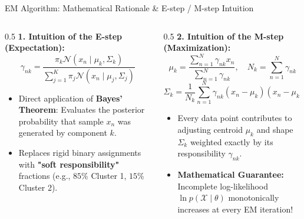 \documentclass[aspectratio=169,10pt]{beamer}
\begin{document}
\begin{frame}{EM Algorithm: Mathematical Rationale \& E-step / M-step Intuition}
  \small
  \begin{columns}[T]
    \begin{column}{0.5\textwidth}
      \textbf{1. Intuition of the E-step (Expectation):}
      $$\gamma_{nk} = \frac{\pi_k \mathcal{N}(x_n \mid \mu_k, \Sigma_k)}{\sum_{j=1}^K \pi_j \mathcal{N}(x_n \mid \mu_j, \Sigma_j)}$$
      \begin{itemize}\setlength{\itemsep}{1.5pt}
        \item Direct application of \textbf{Bayes' Theorem}: Evaluates the posterior probability that sample $x_n$ was generated by component $k$.
        \item Replaces rigid binary assignments with \textbf{"soft responsibility"} fractions (e.g., $85\%$ Cluster 1, $15\%$ Cluster 2).
      \end{itemize}
    \end{column}
    \begin{column}{0.5\textwidth}
      \textbf{2. Intuition of the M-step (Maximization):}
      $$\mu_k = \frac{\sum_{n=1}^N \gamma_{nk} x_n}{\sum_{n=1}^N \gamma_{nk}}, \quad N_k = \sum_{n=1}^N \gamma_{nk}$$
      $$\Sigma_k = \frac{1}{N_k}\sum_{n=1}^N \gamma_{nk} (x_n - \mu_k)(x_n - \mu_k)^T$$
      \begin{itemize}\setlength{\itemsep}{1.5pt}
        \item Every data point contributes to adjusting centroid $\mu_k$ and shape $\Sigma_k$ weighted exactly by its responsibility $\gamma_{nk}$.
        \item \textbf{Mathematical Guarantee:} Incomplete log-likelihood $\ln p(\mathcal{X} \mid \theta)$ monotonically increases at every EM iteration!
      \end{itemize}
    \end{column}
  \end{columns}
\end{frame}
\end{document}

